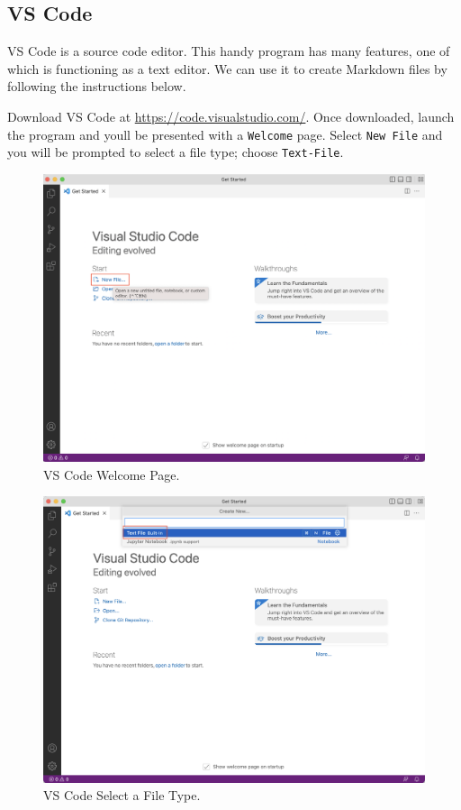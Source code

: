 \documentclass[
]{book}
\begin{document}
\hypertarget{vs-code}{%
\subsection*{VS Code}\label{vs-code}}

VS Code is a source code editor. This handy program has many features, one of which is functioning as a text editor. We can use it to create Markdown files by following the instructions below.

Download VS Code at \url{https://code.visualstudio.com/}. Once downloaded, launch the program and you\textquotesingle ll be presented with a \texttt{Welcome} page. Select \texttt{New\ File} and you will be prompted to select a file type; choose \texttt{Text-File}.

\begin{figure}
\centering
\includegraphics{images/vs-code-1.png}
\caption{VS Code Welcome Page.}
\end{figure}

\begin{figure}
\centering
\includegraphics{images/vs-code-2.png}
\caption{VS Code Select a File Type.}
\end{figure}
\end{document}
